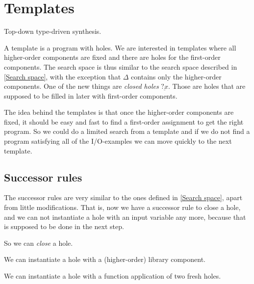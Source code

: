 \section{Templates}
  Top-down type-driven synthesis.

A template is a program with holes. We are interested in templates where all higher-order components are fixed and there are holes for the first-order components.
The search space is thus similar to the search space described in \ref{Search space}, with the exception that $\Delta$ contains only the higher-order components.
One of the new things are \emph{closed holes} $\underline{?x}$. Those are holes that are supposed to be filled in later with first-order components.

The idea behind the templates is that once the higher-order components are fixed, it should be easy and fast to find a first-order assignment to get the right program. So we could do a limited search from a template and if we do not find a program satisfying all of the I/O-examples we can move quickly to the next template.
  
  \subsection{Successor rules}

The successor rules are very similar to the ones defined in \ref{Search space}, apart from little modifications. That is, now we have a successor rule to close a hole, and we can not instantiate a hole with an input variable any more, because that is supposed to be done in the next step.

So we can \emph{close} a hole.
\begin{prooftree}
\end{prooftree}

We can instantiate a hole with a (higher-order) library component.
\begin{prooftree}
\end{prooftree}

We can instantiate a hole with a function application of two fresh holes.
\begin{prooftree}
\end{prooftree}

